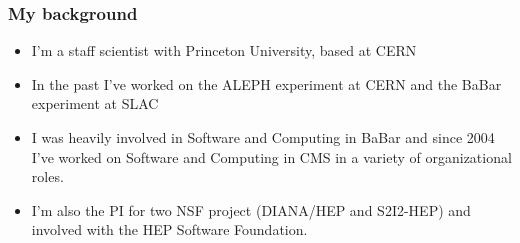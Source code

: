 \begin{frame}
\frametitle{My background}

\begin{itemize}
\item I'm a staff scientist with Princeton University, based at CERN
\item In the past I've worked on the ALEPH experiment at CERN and the BaBar experiment at SLAC
\item I was heavily involved in Software and Computing in BaBar and since 2004 I've worked on Software and Computing in CMS in a variety of organizational roles. 
\item I'm also the PI for two NSF project (DIANA/HEP and S2I2-HEP) and involved with the HEP Software Foundation.
\end{itemize}

\end{frame}


